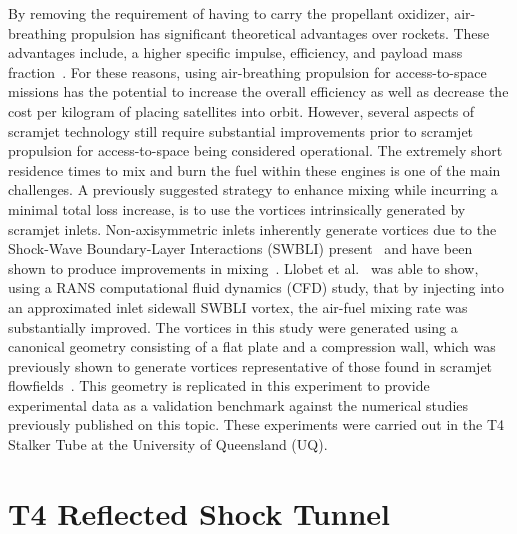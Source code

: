 \documentclass{AIAA}
\begin{document}
By removing the requirement of having to carry the propellant oxidizer, air-breathing propulsion has significant theoretical advantages over rockets.
These advantages include, a higher specific impulse, efficiency, and payload mass fraction~\cite{SmartTetlow,CookHueter}.
For these reasons, using air-breathing propulsion for access-to-space missions has the potential to increase the overall efficiency as well as decrease the cost per kilogram of placing satellites into orbit.
However, several aspects of scramjet technology still require substantial improvements prior to scramjet propulsion for access-to-space being considered operational.
The extremely short residence times to mix and burn the fuel within these engines is one of the main challenges.
A previously suggested strategy to enhance mixing while incurring a minimal total loss increase, is to use the vortices intrinsically generated by scramjet inlets.
Non-axisymmetric inlets inherently generate vortices due to the Shock-Wave Boundary-Layer Interactions (SWBLI) present~\cite{Alvi} and have been shown to produce improvements in mixing~\cite{SpacePlanes_paper2015,Llobet_PlumeElongation}.
Llobet et al.~\cite{Llobet_PlumeElongation} was able to show, using a RANS computational fluid dynamics (CFD) study, that by injecting into an approximated inlet sidewall SWBLI vortex, the air-fuel mixing rate was substantially improved.
The vortices in this study were generated using a canonical geometry consisting of a flat plate and a compression wall, which was previously shown to generate vortices representative of those found in scramjet flowfields~\cite{AFMCpaper2014}.
This geometry is replicated in this experiment to provide experimental data as a validation benchmark against the numerical studies previously published on this topic.
These experiments were carried out in the T4 Stalker Tube at the University of Queensland (UQ).



\section{T4 Reflected Shock Tunnel}
	\label{sec:T4Literature}
	
\end{document}
